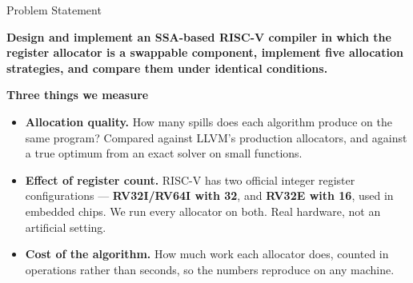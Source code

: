 \documentclass[aspectratio=169,11pt]{beamer}
\begin{document}
\begin{frame}{Problem Statement}
\vspace{1mm}
\begin{minipage}{0.95\textwidth}
\small\textbf{Design and implement an SSA-based RISC-V compiler in which the
register allocator is a swappable component, implement five allocation
strategies, and compare them under identical conditions.}
\end{minipage}
\vspace{4mm}

{\small\textbf{Three things we measure}}
\begin{itemize}\small
  \item[\textbf{1}] \textbf{Allocation quality.} How many spills does each
        algorithm produce on the same program? Compared against LLVM's
        production allocators, and against a true optimum from an exact solver
        on small functions.
  \item[\textbf{2}] \textbf{Effect of register count.} RISC-V has two official
        integer register configurations --- \textbf{RV32I/RV64I with 32}, and
        \textbf{RV32E with 16}, used in embedded chips. We run every allocator
        on both. Real hardware, not an artificial setting.
  \item[\textbf{3}] \textbf{Cost of the algorithm.} How much work each allocator
        does, counted in operations rather than seconds, so the numbers
        reproduce on any machine.
\end{itemize}
\end{frame}
\end{document}
